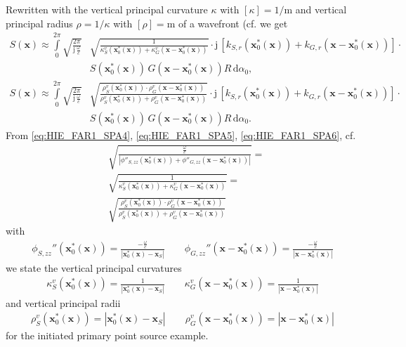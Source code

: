 \documentclass[a4paper,BCOR=15mm,10pt,twoside]{scrartcl}
\newcommand\im{\mathrm{j}}  %
\newcommand\fsd{\mathrm{d}}  %
\newcommand\wc{\frac{\omega}{c}}  %
\newcommand\jwc{\im\,\frac{\omega}{c}}  %
\newcommand\azx{\alpha}  %
\renewcommand{\vec}[1]{\mathbf{#1}}  %
\begin{document}
%
Rewritten with the vertical principal curvature $\kappa$ with $[\kappa] = 1/\text{m}$ and vertical principal radius $\rho=1/\kappa$ with $[\rho] = \text{m}$ of a wavefront (cf. \cite[(4.15)-(4.17), Fig. 3.2, Tab. 3.1]{Firtha2018Diss} we get
%
\begin{align}
\label{eq:HIE_FAR1_SPA5}
S(\vec{x}) \approx \int\limits_{0}^{2\pi} 
\sqrt{\frac{2\pi}{\jwc}} &
\sqrt{\frac{1}{\kappa_S^v(\vec{x}_0^*(\vec{x}))+\kappa_G^v(\vec{x}-\vec{x}_0^*(\vec{x}))}} 
\cdot \im \, \left[
k_{S,r}(\vec{x}_0^*(\vec{x})) + k_{G,r}(\vec{x} - \vec{x}_0^*(\vec{x}))
\right]\cdot\nonumber\\
&S(\vec{x}_0^*(\vec{x}))\,G(\vec{x}-\vec{x}_0^*(\vec{x}))
R \, \fsd \azx_0,
\end{align}
%
\begin{align}
\label{eq:HIE_FAR1_SPA6}
S(\vec{x}) \approx \int\limits_{0}^{2\pi}
\sqrt{\frac{2\pi}{\jwc}} &
\sqrt{\frac{\rho_S^v(\vec{x}_0^*(\vec{x}))\cdot\rho_G^v(\vec{x}-\vec{x}_0^*(\vec{x}))}{\rho_S^v(\vec{x}_0^*(\vec{x}))+\rho_G^v(\vec{x}-\vec{x}_0^*(\vec{x}))}} 
\cdot \im \, \left[
k_{S,r}(\vec{x}_0^*(\vec{x})) + k_{G,r}(\vec{x} - \vec{x}_0^*(\vec{x}))
\right]\cdot\nonumber\\
&S(\vec{x}_0^*(\vec{x}))\,G(\vec{x}-\vec{x}_0^*(\vec{x}))
R \, \fsd \azx_0.
\end{align}
%
From \eqref{eq:HIE_FAR1_SPA4}, \eqref{eq:HIE_FAR1_SPA5}, \eqref{eq:HIE_FAR1_SPA6}, cf. \cite[(4.15-4.17)]{Firtha2018Diss}
\begin{align}
&\sqrt{\frac{\wc}{|\phi''_{S,zz}(\vec{x}_0^*(\vec{x}))+\phi''_{G,zz}(\vec{x}-\vec{x}_0^*(\vec{x}))|}}=\\ 
&\sqrt{\frac{1}{\kappa_S^v(\vec{x}_0^*(\vec{x}))+\kappa_G^v(\vec{x}-\vec{x}_0^*(\vec{x}))}}=\\
&\sqrt{\frac{\rho_S^v(\vec{x}_0^*(\vec{x}))\cdot\rho_G^v(\vec{x}-\vec{x}_0^*(\vec{x}))}{\rho_S^v(\vec{x}_0^*(\vec{x}))+\rho_G^v(\vec{x}-\vec{x}_0^*(\vec{x}))}} 
\end{align}
with
\begin{align}
\phi_{S,zz}''(\vec{x}_0^*(\vec{x})) = \frac{-\wc}{|\vec{x}_0^*(\vec{x})-\vec{x}_S|}\qquad
\phi_{G,zz}''(\vec{x}-\vec{x}_0^*(\vec{x}))  = \frac{-\wc}{|\vec{x}-\vec{x}_0^*(\vec{x})|}
\end{align}
we state the vertical principal curvatures
\begin{align}
\kappa_S^v(\vec{x}_0^*(\vec{x})) = \frac{1}{|\vec{x}_0^*(\vec{x})-\vec{x}_S|}\qquad
\kappa_G^v(\vec{x}-\vec{x}_0^*(\vec{x})) = \frac{1}{|\vec{x}-\vec{x}_0^*(\vec{x})|}
\end{align}
and vertical principal radii
\begin{align}
\rho_S^v(\vec{x}_0^*(\vec{x})) = |\vec{x}_0^*(\vec{x})-\vec{x}_S|\qquad
\rho_G^v(\vec{x}-\vec{x}_0^*(\vec{x})) = |\vec{x}-\vec{x}_0^*(\vec{x})|
\end{align}
for the initiated primary point source example.
%
\end{document}
